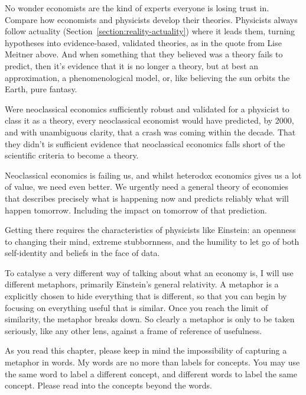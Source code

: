 No wonder economists  are the kind of experts everyone is losing trust in\cite{wolf-economists-failed-experts}. Compare how economists\cite{keen-debunking} and physicists develop their theories. Physicists always follow actuality (Section~\ref{section:reality-actuality}) where it leads them, turning hypotheses into evidence-based, validated theories, as in the quote from Lise Meitner above. And when something that they believed was a theory fails to predict, then it's evidence that it is no longer a theory, but at best an approximation, a phenomenological model, or, like believing the sun orbits the Earth, pure fantasy. 


Were neoclassical economics sufficiently robust and validated for a physicist to class it as a theory, every neoclassical economist would have predicted, by 2000, and with unambiguous clarity, that a crash was coming within the decade. That they didn’t is sufficient evidence that neoclassical economics falls short of the scientific criteria to become a theory.


Neoclassical economics is failing us, and whilst heterodox economics gives us a lot of value, we need even better. We urgently need a general theory of economies that describes precisely what is happening now and predicts reliably what will happen tomorrow. Including the impact on tomorrow of that prediction.


Getting there requires the characteristics of physicists like Einstein:  an openness to changing their mind, extreme stubbornness, and the humility to let go of both self-identity and beliefs in the face of data.


To catalyse a very different way of talking about what an economy is, I will use different metaphors, primarily Einstein's general relativity. A metaphor  is a   explicitly chosen to hide everything that is different, so that you can begin by focusing on everything useful that is similar. Once you reach the limit of similarity, the metaphor breaks down. So clearly a metaphor is only to be taken seriously, like any other lens, against a frame of reference  of usefulness. 


As you read this chapter, please keep in mind the impossibility of capturing a metaphor in words. My words are no more than labels for concepts. You may use the same word to label a different concept, and different words to label the same concept. Please read into the concepts beyond the words.


